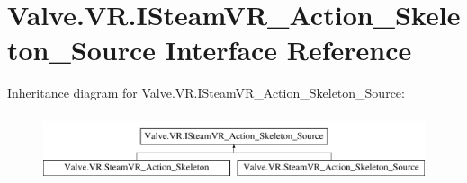 \hypertarget{interface_valve_1_1_v_r_1_1_i_steam_v_r___action___skeleton___source}{}\section{Valve.\+V\+R.\+I\+Steam\+V\+R\+\_\+\+Action\+\_\+\+Skeleton\+\_\+\+Source Interface Reference}
\label{interface_valve_1_1_v_r_1_1_i_steam_v_r___action___skeleton___source}
Inheritance diagram for Valve.\+V\+R.\+I\+Steam\+V\+R\+\_\+\+Action\+\_\+\+Skeleton\+\_\+\+Source\+:\begin{figure}[H]
\begin{center}
\leavevmode
\includegraphics[height=2.000000cm]{interface_valve_1_1_v_r_1_1_i_steam_v_r___action___skeleton___source}
\end{center}
\end{figure}
